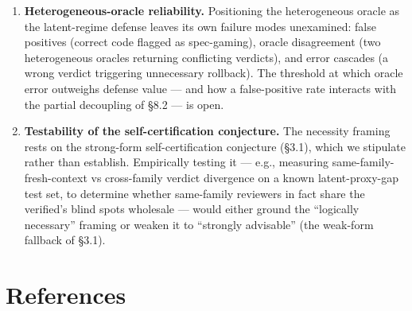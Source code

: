 \documentclass[
  11pt,
]{article}
\begin{document}
\begin{enumerate}
  that the boundary becomes conventional.
\item
  \textbf{Heterogeneous-oracle reliability.} Positioning the
  heterogeneous oracle as the latent-regime defense leaves its own
  failure modes unexamined: false positives (correct code flagged as
  spec-gaming), oracle disagreement (two heterogeneous oracles returning
  conflicting verdicts), and error cascades (a wrong verdict triggering
  unnecessary rollback). The threshold at which oracle error outweighs
  defense value --- and how a false-positive rate interacts with the
  partial decoupling of §8.2 --- is open.
\item
  \textbf{Testability of the self-certification conjecture.} The
  necessity framing rests on the strong-form self-certification
  conjecture (§3.1), which we stipulate rather than establish.
  Empirically testing it --- e.g., measuring same-family-fresh-context
  vs cross-family verdict divergence on a known latent-proxy-gap test
  set, to determine whether same-family reviewers in fact share the
  verified's blind spots wholesale --- would either ground the
  ``logically necessary'' framing or weaken it to ``strongly advisable''
  (the weak-form fallback of §3.1).
\end{enumerate}

\section{References}\label{references}
\end{document}
